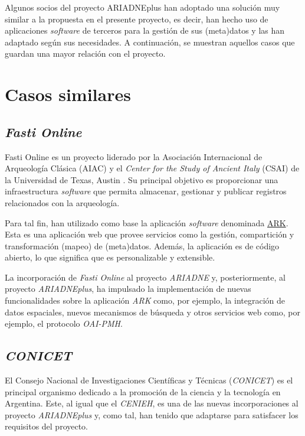 
Algunos socios del proyecto ARIADNEplus han adoptado una solución muy
similar a la propuesta en el presente proyecto, es decir, han hecho uso
de aplicaciones \emph{software} de terceros para la gestión de sus
(meta)datos y las han adaptado según sus necesidades. A continuación, se
muestran aquellos casos que guardan una mayor relación con el proyecto.

\section{Casos similares}

\subsection{\emph{Fasti Online}}

Fasti Online \cite{weboff:fasti}
es un proyecto liderado por la Asociación Internacional de Arqueología
Clásica (AIAC) \cite{weboff:aiac} y el \emph{Center
for the Study of Ancient Italy} (CSAI) \cite{weboff:csai} de la Universidad
de Texas, Austin \cite{weboff:uot}. Su principal objetivo es proporcionar
una infraestructura \emph{software} que permita almacenar, gestionar y
publicar registros relacionados con la arqueología.

Para tal fin, han utilizado como base la aplicación \emph{software}
denominada \href{https://ark.lparchaeology.com/}{ARK}. Esta es una
aplicación web que provee servicios como la gestión, compartición y
transformación (mapeo) de (meta)datos. Además, la aplicación es de
código abierto, lo que significa que es personalizable y extensible.

La incorporación de \emph{Fasti Online} al proyecto \emph{ARIADNE} y,
posteriormente, al proyecto \emph{ARIADNEplus}, ha impulsado la
implementación de nuevas funcionalidades sobre la aplicación \emph{ARK}
como, por ejemplo, la integración de datos espaciales, nuevos mecanismos
de búsqueda y otros servicios web como, por ejemplo, el protocolo
\emph{OAI-PMH}.

\subsection{\emph{CONICET}}

El Consejo Nacional de Investigaciones Científicas y Técnicas \cite{weboff:conicet} 
(\emph{CONICET}) es el principal organismo dedicado a la promoción de la ciencia y la
tecnología en Argentina. Este, al igual que el \emph{CENIEH}, es una de las
nuevas incorporaciones al proyecto \emph{ARIADNEplus} y, como tal, han
tenido que adaptarse para satisfacer los requisitos del proyecto.

